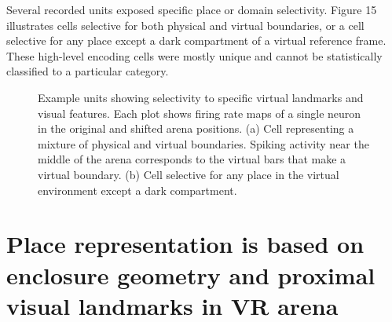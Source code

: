 Several recorded units exposed specific place or domain selectivity. Figure 15 illustrates cells selective for both physical and virtual boundaries, or a cell selective for any place except a dark compartment of a virtual reference frame. These high-level encoding cells were mostly unique and cannot be statistically classified to a particular category.

\begin{figure}
\captionsetup{format=plain}
\caption[Specific place cells]{
Example units showing selectivity to specific virtual landmarks and visual features. Each plot shows firing rate maps of a single neuron in the original and shifted arena positions. (a) Cell representing a mixture of physical and virtual boundaries. Spiking activity near the middle of the arena corresponds to the virtual bars that make a virtual boundary. (b) Cell selective for any place in the virtual environment except a dark compartment.
}
\label{fig:F15_specific_cells}
\end{figure}


\section[Geometry and visual landmarks forming place representation]{Place representation is based on enclosure geometry and proximal visual landmarks in VR arena%
              }
\label{sec:env_geometry}

